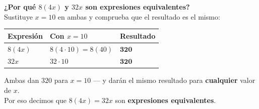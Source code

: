 \documentclass[12pt, letterpaper]{article}
\begin{document}
\vspace{0.3cm}
\begin{ejemplo}
	\textbf{¿Por qué $8(4x)$ y $32x$ son expresiones equivalentes?}\\
	Sustituye $x = 10$ en ambas y comprueba que el resultado es el mismo:

	\vspace{0.2cm}
	\begin{center}
		\renewcommand{\arraystretch}{1.5}
		\begin{tabular}{|m{4cm}|m{4cm}|m{4cm}|}
			\hline
			\rowcolor{valblue!15}
			\textbf{Expresión} & \textbf{Con $x = 10$} & \textbf{Resultado} \\
			\hline
			$8(4x)$            & $8(4\cdot10) = 8(40)$ & $\mathbf{320}$     \\
			\hline
			$32x$              & $32 \cdot 10$         & $\mathbf{320}$     \\
			\hline
		\end{tabular}
	\end{center}

	\vspace{0.2cm}
	Ambas dan $320$ para $x=10$ --- y darán el mismo resultado
	para \textbf{cualquier} valor de $x$.\\
	Por eso decimos que $8(4x) = 32x$ son \textbf{expresiones equivalentes}.
\end{ejemplo}
\end{document}
